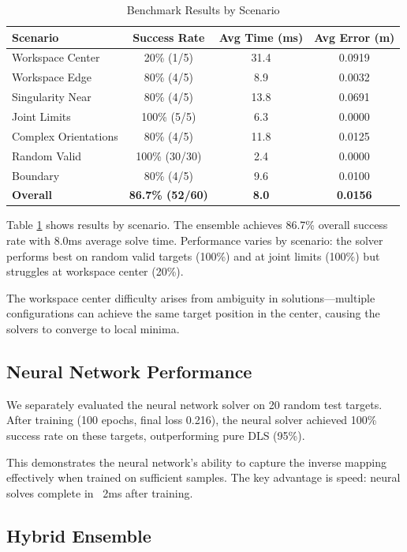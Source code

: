 {{\begin{table}[h!]
\centering
\caption{Benchmark Results by Scenario}
\begin{tabular}{|l|c|c|c|}
\hline
Scenario & Success Rate & Avg Time (ms) & Avg Error (m)\\
\hline
Workspace Center & 20\% (1/5) & 31.4 & 0.0919\\
Workspace Edge & 80\% (4/5) & 8.9 & 0.0032\\
Singularity Near & 80\% (4/5) & 13.8 & 0.0691\\
Joint Limits & 100\% (5/5) & 6.3 & 0.0000\\
Complex Orientations & 80\% (4/5) & 11.8 & 0.0125\\
Random Valid & 100\% (30/30) & 2.4 & 0.0000\\
Boundary & 80\% (4/5) & 9.6 & 0.0100\\
\hline
\textbf{Overall} & \textbf{86.7\% (52/60)} & \textbf{8.0} & \textbf{0.0156}\\
\hline
\end{tabular}
\label{tab:benchmark}
\end{table}

Table \ref{tab:benchmark} shows results by scenario. The ensemble achieves 86.7\% overall success rate with 8.0ms average solve time. Performance varies by scenario: the solver performs best on random valid targets (100\%) and at joint limits (100\%) but struggles at workspace center (20\%).

The workspace center difficulty arises from ambiguity in solutions—multiple configurations can achieve the same target position in the center, causing the solvers to converge to local minima.

\subsection{Neural Network Performance}

We separately evaluated the neural network solver on 20 random test targets. After training (100 epochs, final loss 0.216), the neural solver achieved 100\% success rate on these targets, outperforming pure DLS (95\%).

This demonstrates the neural network's ability to capture the inverse mapping effectively when trained on sufficient samples. The key advantage is speed: neural solves complete in ~2ms after training.

\subsection{Hybrid Ensemble}

}}

